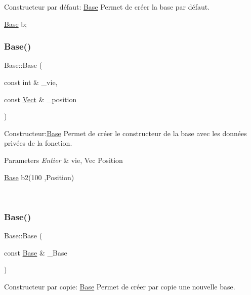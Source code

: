 Constructeur par défaut\+: \hyperlink{classBase}{Base} Permet de créer la base par défaut. 


\begin{DoxyCode}
\hyperlink{classBase}{Base} b;
\end{DoxyCode}
 \mbox{\label{classBase_aa56feb99f89924004cbb864cce83ccc0}} 
\subsubsection{\texorpdfstring{Base()}{Base()}\hspace{0.1cm}{\footnotesize\ttfamily [2/3]}}
{\footnotesize\ttfamily Base\+::\+Base (\begin{DoxyParamCaption}\item[{const int \&}]{\+\_\+vie,  }\item[{const \hyperlink{classVect}{Vect} \&}]{\+\_\+position }\end{DoxyParamCaption})}



Constructeur\+:\hyperlink{classBase}{Base} Permet de créer le constructeur de la base avec les données privées de la fonction. 


\begin{DoxyParams}{Parameters}
{\em Entier} & vie, Vec Position 
\begin{DoxyCode}
\hyperlink{classBase}{Base} b2(100 ,Position)
\end{DoxyCode}
 \\
\hline
\end{DoxyParams}
\mbox{\label{classBase_a8520b7acb2f08e4c892a7ea3213539a7}} 
\subsubsection{\texorpdfstring{Base()}{Base()}\hspace{0.1cm}{\footnotesize\ttfamily [3/3]}}
{\footnotesize\ttfamily Base\+::\+Base (\begin{DoxyParamCaption}\item[{const \hyperlink{classBase}{Base} \&}]{\+\_\+\+Base }\end{DoxyParamCaption})}



Constructeur par copie\+: \hyperlink{classBase}{Base} Permet de créer par copie une nouvelle base. 


